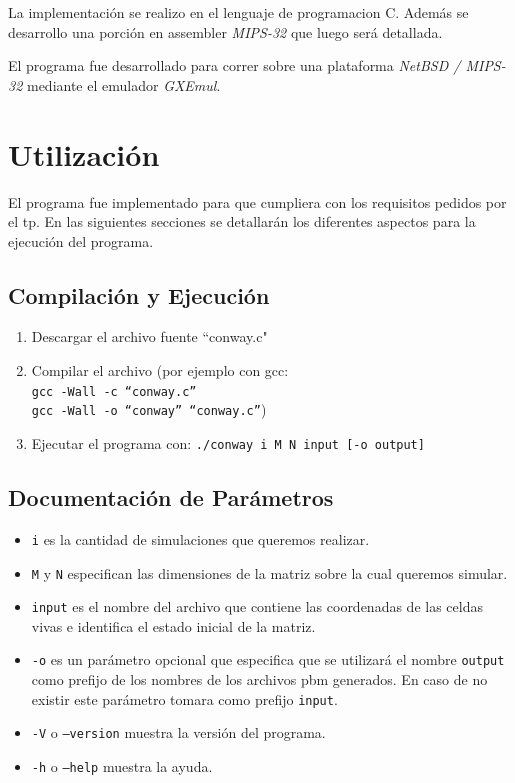 \documentclass[11pt,a4paper]{article}
\begin{document}
La implementación se realizo en el lenguaje de programacion C. Además se desarrollo una porción en assembler \emph{MIPS-32} que luego será detallada.

El programa fue desarrollado para correr sobre una plataforma \emph{NetBSD / MIPS-32} mediante el emulador \emph{GXEmul}.



\section{Utilización}
El programa fue implementado para que cumpliera con los requisitos pedidos por el tp.
En las siguientes secciones se detallarán los diferentes aspectos para la ejecución del programa.

\subsection{Compilación y Ejecución}
\begin{enumerate}
	\item Descargar el archivo fuente ``conway.c"
	\item Compilar el archivo (por ejemplo con gcc:\\
	\texttt{gcc -Wall -c  ``conway.c''\\
	gcc -Wall -o ``conway'' ``conway.c''})
	\item Ejecutar el programa con: \texttt{./conway i M N input [-o output]}
\end{enumerate}

\subsection{Documentación de Parámetros}
\begin{itemize}
	\item \texttt{i} es la cantidad de simulaciones que queremos realizar.
	\item \texttt{M} y \texttt{N} especifican las dimensiones de la matriz sobre la cual queremos simular.
	\item \texttt{input} es el nombre del archivo que contiene las coordenadas de las celdas vivas e identifica el estado inicial de la matriz.
	\item \texttt{-o} es un parámetro opcional que especifica que se utilizará el nombre \texttt{output} como prefijo de los nombres de los archivos pbm generados. En caso de no existir este parámetro tomara como prefijo \texttt{input}.
	\item \texttt{-V} o \texttt{--version} muestra la versión del programa.
	\item \texttt{-h} o \texttt{--help} muestra la ayuda.
\end{itemize}
\end{document}

